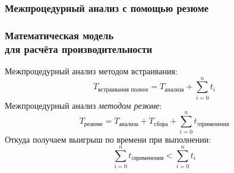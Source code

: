 \documentclass[hyperref={pdfpagelabels=false},10pt]{beamer}
\begin{document}
\begin{frame}
\frametitle{Межпроцедурный анализ с помощью резюме}
\begin{figure}[h]
\end{figure}
\end{frame}
\begin{frame}
\frametitle{Математическая модель\\для расчёта производительности}
Межпроцедурный анализ методом встраивания:
\begin{equation*}
 T_{\text{встраивания полное}} = T_{\text{анализа}} + \sum_{i = 0}^{n} t_i 
\end{equation*}
Межпроцедурный анализ \textit{методом резюме}:
\begin{equation*}
 T_{\text{резюме}} = T_{\text{анализа}} + T_{\text{сбора}} + \sum_{i = 0}^{n} t_{i \text{применения}}
\end{equation*}
Откуда получаем выигрыш по времени при выполнении:
\begin{equation*}
 \sum_{i = 0}^{n} t_{i \text{применения}} <  \sum_{i = 0}^{n} t_i
\end{equation*}


\end{frame}
\end{document}
